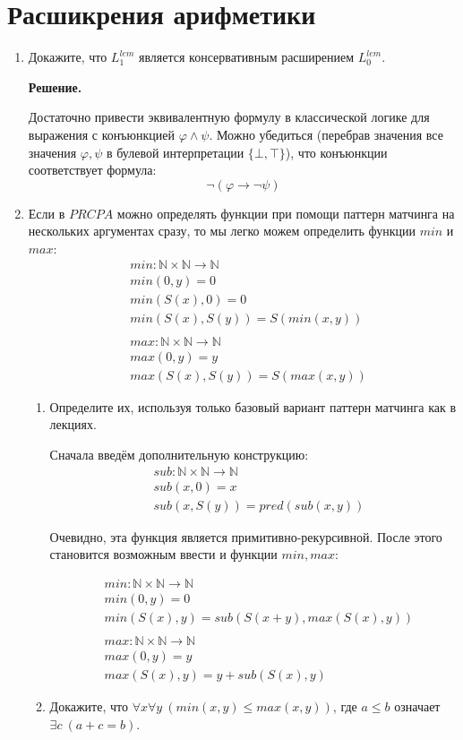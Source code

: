 \section*{Расшикрения арифметики}

\begin{enumerate}

\item Докажите, что $L_1^{lem}$ является консервативным расширением $L_0^{lem}$.

\textbf{Решение.} 

Достаточно привести эквивалентную формулу в классической логике для выражения с конъюнкцией $\varphi \land \psi$. Можно убедиться (перебрав значения все значения $\varphi, \psi$ в булевой интерпретации $\{\bot,\top\}$), что конъюнкции соответствует формула:
\begin{equation*}
	\neg(\varphi \to \neg \psi)
\end{equation*}

\item Если в $PRCPA$ можно определять функции при помощи паттерн матчинга на нескольких аргументах сразу, то мы легко можем определить функции $min$ и $max$:
\begin{align*}
& min : \mathbb{N} \times \mathbb{N} \to \mathbb{N} \\
& min(0,y) = 0 \\
& min(S(x),0) = 0 \\
& min(S(x),S(y)) = S(min(x,y)) \\
& \\
& max : \mathbb{N} \times \mathbb{N} \to \mathbb{N} \\
& max(0,y) = y \\
& max(S(x),S(y)) = S(max(x,y))
\end{align*}
\begin{enumerate}
\item Определите их, используя только базовый вариант паттерн матчинга как в лекциях.

Сначала введём дополнительную конструкцию:
\begin{align*}
& sub : \mathbb{N} \times \mathbb{N} \to \mathbb{N} \\
& sub (x, 0) = x \\
& sub (x, S(y)) = pred (sub(x, y))
\end{align*}

Очевидно, эта функция является примитивно-рекурсивной. После этого становится возможным ввести и функции $min, max$:

\begin{align*}
& min : \mathbb{N} \times \mathbb{N} \to \mathbb{N} \\
& min(0,y) = 0 \\
& min(S(x), y) = sub(S(x + y), max(S(x), y)) \\
& \\
& max : \mathbb{N} \times \mathbb{N} \to \mathbb{N} \\
& max(0,y) = y \\
& max(S(x), y) = y + sub(S(x), y)
\end{align*}
\item Докажите, что $\forall x \forall y\ (min(x,y) \leq max(x,y))$, где $a \leq b$ означает $\exists c\ (a + c = b)$.


\end{enumerate}
\end{enumerate}
